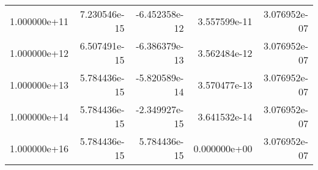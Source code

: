 \begin{tabular}{lrrrr}
1.000000e+11 &              7.230546e-15 &                   -6.452358e-12 &  3.557599e-11 &  3.076952e-07 \\
1.000000e+12 &              6.507491e-15 &                   -6.386379e-13 &  3.562484e-12 &  3.076952e-07 \\
1.000000e+13 &              5.784436e-15 &                   -5.820589e-14 &  3.570477e-13 &  3.076952e-07 \\
1.000000e+14 &              5.784436e-15 &                   -2.349927e-15 &  3.641532e-14 &  3.076952e-07 \\
1.000000e+16 &              5.784436e-15 &                    5.784436e-15 &  0.000000e+00 &  3.076952e-07 \\
\bottomrule
\end{tabular}
